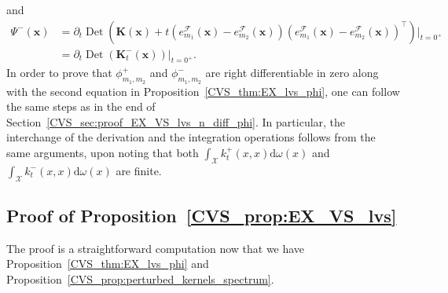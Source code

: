 \documentclass[twoside,11pt]{book}
\numberwithin{theorem}{chapter}
\numberwithin{definition}{chapter}
\numberwithin{proposition}{chapter}
\numberwithin{corollary}{chapter}
\numberwithin{example}{chapter}
\numberwithin{lemma}{chapter}
\numberwithin{assumption}{chapter}
\numberwithin{equation}{chapter}
\numberwithin{figure}{chapter}
\DeclareMathOperator{\Det}{Det}
\DeclareMathOperator{\Tran}{\intercal}
\DeclareMathOperator{\X}{\mathcal{X}}
\newcommand{\ab}[1]{\textcolor{red}{#1}}
\begin{document}
and
\begin{align}
\Psi^{-}(\bm{x}) & = \partial_{t} \Det \left(\bm{K}(\bm{x})+t \left(e_{m_{1}}^{\mathcal{F}}(\bm{x}) - e_{m_{2}}^{\mathcal{F}}(\bm{x}) \right)\left(e_{m_{1}}^{\mathcal{F}}(\bm{x}) - e_{m_{2}}^{\mathcal{F}}(\bm{x}) \right)^{\Tran} \right)|_{t = 0^{+}} \nonumber \\
& = \partial_{t} \Det \left(\bm{K}_{t}^{-}(\bm{x})\right)|_{t = 0^{+}}.
\end{align}
In order to prove that $\phi_{m_{1},m_{2}}^{+}$ and $\phi_{m_{1},m_{2}}^{-}$ are right differentiable in zero along with the second equation in Proposition~\ref{CVS_thm:EX_lvs_phi}, one can follow the same steps as in the end of Section~\ref{CVS_sec:proof_EX_VS_lvs_n_diff_phi}. In particular, the interchange of the derivation and the integration operations follows from the same arguments, upon noting that both $\int_{\X} k_{t}^{+}(x,x) \mathrm{d}\omega(x)$ and $\int_{\X} k_{t}^{-}(x,x) \mathrm{d}\omega(x)$ are finite.



\subsection{Proof of Proposition~\ref{CVS_prop:EX_VS_lvs}}\label{CVS_sec:proof_EX_VS_lvs}
The proof is a straightforward computation now that we have Proposition~\ref{CVS_thm:EX_lvs_phi} and Proposition~\ref{CVS_prop:perturbed_kernels_spectrum}.
\end{document}
